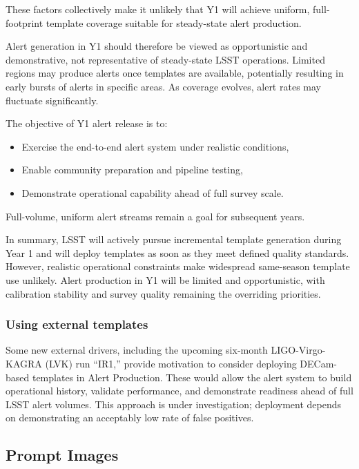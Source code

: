 These factors collectively make it unlikely that Y1 will achieve uniform, full-footprint template coverage suitable for steady-state alert production.

Alert generation in Y1 should therefore be viewed as opportunistic and demonstrative, not representative of steady-state LSST operations.
Limited regions may produce alerts once templates are available, potentially resulting in early bursts of alerts in specific areas.
As coverage evolves, alert rates may fluctuate significantly.

The objective of Y1 alert release is to:
\begin{itemize}

\item Exercise the end-to-end alert system under realistic conditions,

\item Enable community preparation and pipeline testing,

\item Demonstrate operational capability ahead of full survey scale.

\end{itemize}
Full-volume, uniform alert streams remain a goal for subsequent years.

In summary, LSST will actively pursue incremental template generation during Year 1 and will deploy templates as soon as they meet defined quality standards.
However, realistic operational constraints make widespread same-season template use unlikely.
Alert production in Y1 will be limited and opportunistic, with calibration stability and survey quality remaining the overriding priorities.

\subsubsection{Using external templates}
Some new external drivers, including the upcoming six-month LIGO-Virgo-KAGRA (LVK) run ``IR1,” provide motivation to consider deploying DECam-based templates in Alert Production.
These would allow the alert system to build operational history, validate performance, and demonstrate readiness ahead of full LSST alert volumes.
This approach is under investigation; deployment depends on demonstrating an acceptably low rate of false positives.

\subsection{Prompt Images}
\label{ssec:prompt-images}

